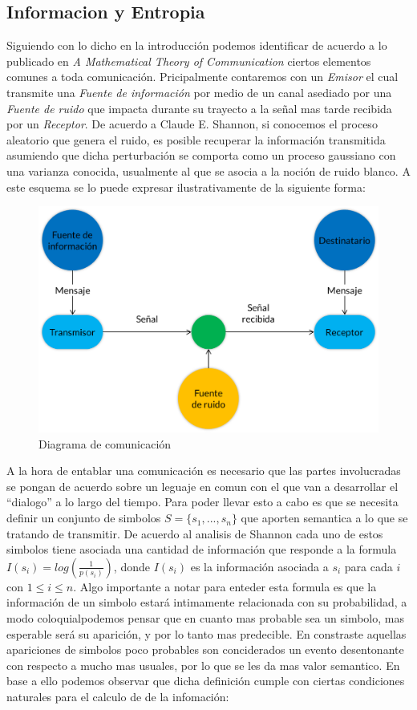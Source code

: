 
\subsection{Informacion y Entropia}

Siguiendo con lo dicho en la introducción podemos identificar de acuerdo a lo publicado en \textit{A Mathematical Theory of Communication} ciertos elementos comunes a toda comunicación. Pricipalmente contaremos con un \textit{Emisor} el cual transmite una \textit{Fuente de información} por medio de un canal asediado por una \textit{Fuente de ruido} que impacta durante su trayecto a la señal mas tarde recibida por un \textit{Receptor}. De acuerdo a Claude E. Shannon, si conocemos el proceso aleatorio que genera el ruido, es posible recuperar la información transmitida asumiendo que dicha perturbación se comporta como un proceso gaussiano con una varianza conocida, usualmente al que se asocia a la noción de ruido blanco. A este esquema se lo puede expresar ilustrativamente de la siguiente forma:

\begin{figure}[ht]
\begin{center}
\includegraphics[width=0.6\columnwidth]{EsquemaShannon.png}
\caption{Diagrama de comunicación}
\end{center}
\end{figure}


A la hora de entablar una comunicación es necesario que las partes involucradas se pongan de acuerdo sobre un leguaje en comun con el que van a desarrollar el "`dialogo"' a lo largo del tiempo. Para poder llevar esto a cabo es que se necesita definir un conjunto de simbolos $S = \{ s_1, ..., s_n \}$ que aporten semantica a lo que se tratando de transmitir. De acuerdo al analisis de Shannon cada uno de estos simbolos tiene asociada una cantidad de información que responde a la formula $I(s_i) = log(\frac{1}{p(s_i)})$, donde $I(s_i)$ es la información asociada a $s_i$ para cada $i$ con $1 \leq i \leq n$. Algo importante a notar para enteder esta formula es que la información de un simbolo estará intimamente relacionada con su probabilidad, a modo coloquialpodemos pensar que en cuanto mas probable sea un simbolo, mas esperable será su aparición, y por lo tanto mas predecible. En constraste aquellas apariciones de simbolos poco probables son conciderados un evento desentonante con respecto a mucho mas usuales, por lo que se les da mas valor semantico. En base a ello podemos observar que dicha definición cumple con ciertas condiciones naturales para el calculo de de la infomación:

